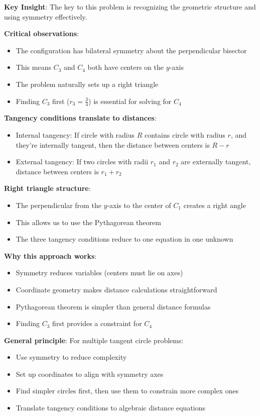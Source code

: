 \documentclass[11pt]{article}
\begin{document}
\begin{keyinsightbox}
\textbf{Key Insight}: The key to this problem is recognizing the geometric structure and using symmetry effectively.

\textbf{Critical observations}:
\begin{itemize}
    \item The configuration has bilateral symmetry about the perpendicular bisector
    \item This means $C_3$ and $C_4$ both have centers on the $y$-axis
    \item The problem naturally sets up a right triangle
    \item Finding $C_3$ first ($r_3 = \frac{3}{4}$) is essential for solving for $C_4$
\end{itemize}

\textbf{Tangency conditions translate to distances}:
\begin{itemize}
    \item Internal tangency: If circle with radius $R$ contains circle with radius $r$, and they're internally tangent, then the distance between centers is $R - r$
    \item External tangency: If two circles with radii $r_1$ and $r_2$ are externally tangent, distance between centers is $r_1 + r_2$
\end{itemize}

\textbf{Right triangle structure}:
\begin{itemize}
    \item The perpendicular from the $y$-axis to the center of $C_1$ creates a right angle
    \item This allows us to use the Pythagorean theorem
    \item The three tangency conditions reduce to one equation in one unknown
\end{itemize}

\textbf{Why this approach works}:
\begin{itemize}
    \item Symmetry reduces variables (centers must lie on axes)
    \item Coordinate geometry makes distance calculations straightforward
    \item Pythagorean theorem is simpler than general distance formulas
    \item Finding $C_3$ first provides a constraint for $C_4$
\end{itemize}

\textbf{General principle}: For multiple tangent circle problems:
\begin{itemize}
    \item Use symmetry to reduce complexity
    \item Set up coordinates to align with symmetry axes
    \item Find simpler circles first, then use them to constrain more complex ones
    \item Translate tangency conditions to algebraic distance equations
\end{itemize}
\end{keyinsightbox}
\end{document}
